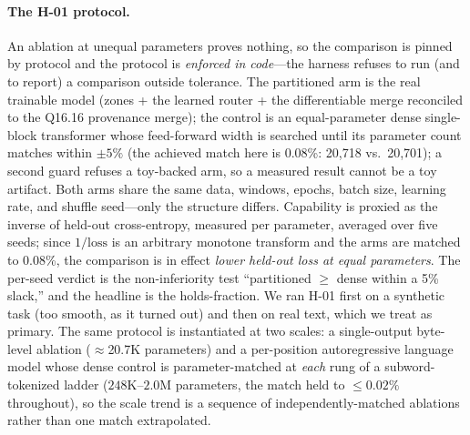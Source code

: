 \documentclass[11pt]{article}
\newcommand{\Qff}{Q16.16}
\begin{document}
\paragraph{The H-01 protocol.}
An ablation at unequal parameters proves nothing, so the comparison is pinned by protocol and the
protocol is \emph{enforced in code}---the harness refuses to run (and to report) a comparison outside
tolerance. The partitioned arm is the real trainable model (zones + the learned router + the
differentiable merge reconciled to the \Qff{} provenance merge); the control is an equal-parameter
dense single-block transformer whose feed-forward width is searched until its parameter count matches
within $\pm5\%$ (the achieved match here is 0.08\%: 20{,}718 vs.\ 20{,}701); a second guard refuses a
toy-backed arm, so a measured result cannot be a toy artifact. Both arms share the same data, windows,
epochs, batch size, learning rate, and shuffle seed---only the structure differs. Capability is
proxied as the inverse of held-out cross-entropy, measured per parameter, averaged over five seeds;
since $1/\mathrm{loss}$ is an arbitrary monotone transform and the arms are matched to 0.08\%, the
comparison is in effect \emph{lower held-out loss at equal parameters}. The per-seed verdict is the
non-inferiority test ``partitioned $\geq$ dense within a 5\% slack,'' and the headline is the
holds-fraction. We ran H-01 first on a synthetic task (too smooth, as it turned out) and then on real
text, which we treat as primary. The same protocol is instantiated at two scales: a single-output
byte-level ablation ($\approx$20.7K parameters) and a per-position autoregressive language model
whose dense control is parameter-matched at \emph{each} rung of a subword-tokenized ladder
($248\mathrm{K}$--$2.0\mathrm{M}$ parameters, the match held to $\le 0.02\%$ throughout), so the
scale trend is a sequence of independently-matched ablations rather than one match extrapolated.
\end{document}
